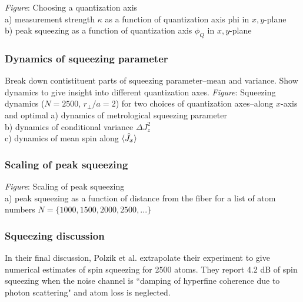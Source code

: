 \documentclass[preprint,aps,pra,onecolumn]{revtex4-1} %
\newcommand{\comment}[1]{{\color{Maroon} #1}}
\begin{document}
\comment{\emph{Figure}: Choosing a quantization axis\\
a) measurement strength $\kappa$ as a function of quantization axis phi in $x,y$-plane\\
b) peak squeezing as a function of quantization axis $\phi_Q$ in $x,y$-plane}

\subsubsection{Dynamics of squeezing parameter}
Break down contistituent parts of squeezing parameter--mean and variance. Show dynamics to give insight into different quantization axes.
\comment{
\emph{Figure}:  Squeezing dynamics ($N=2500$, $r_\perp/a = 2$) for two choices of quantization axes--along $x$-axis and optimal
a) dynamics of metrological squeezing parameter \\
b) dynamics of conditional variance $\Delta J_z^2$ \\
c) dynamics of mean spin along $\langle{\hat{J}_x}\rangle$
}

\subsubsection{Scaling of peak squeezing}
\comment{
\emph{Figure}:  Scaling of peak squeezing \\
a) peak squeezing as a function of distance from the fiber for a list of atom numbers $N= \{1000,1500,2000,2500,...\}$
}

\subsubsection{Squeezing discussion}	
In their final discussion, Polzik et al. \cite{beguin_generation_2014} extrapolate their experiment to give numerical estimates of spin squeezing for 2500 atoms.  They report 4.2 dB of spin squeezing when the noise channel is ``damping of hyperfine coherence due to photon scattering" and atom loss is neglected. 
\end{document}
